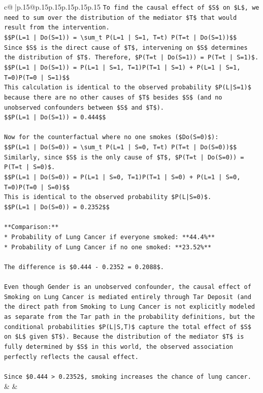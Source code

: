 \documentclass{article}
\begin{document}
{\begin{supertabular}{c@{$\;$}|p{.15\linewidth}@{}p{.15\linewidth}p{.15\linewidth}p{.15\linewidth}p{.15\linewidth}p{.15\linewidth}}
{{{\texttt{To find the causal effect of \$S\$ on \$L\$, we need to sum over the distribution of the mediator \$T\$ that would result from the intervention.} \\
\texttt{\$\$P(L=1 | Do(S=1)) = \textbackslash{}sum\_t P(L=1 | S=1, T=t) P(T=t | Do(S=1))\$\$} \\
\texttt{Since \$S\$ is the direct cause of \$T\$, intervening on \$S\$ determines the distribution of \$T\$. Therefore, \$P(T=t | Do(S=1)) = P(T=t | S=1)\$.} \\
\texttt{\$\$P(L=1 | Do(S=1)) = P(L=1 | S=1, T=1)P(T=1 | S=1) + P(L=1 | S=1, T=0)P(T=0 | S=1)\$\$} \\
\texttt{This calculation is identical to the observed probability \$P(L|S=1)\$ because there are no other causes of \$T\$ besides \$S\$ (and no unobserved confounders between \$S\$ and \$T\$).} \\
\texttt{\$\$P(L=1 | Do(S=1)) = 0.444\$\$} \\
\\ 
\texttt{Now for the counterfactual where no one smokes (\$Do(S=0)\$):} \\
\texttt{\$\$P(L=1 | Do(S=0)) = \textbackslash{}sum\_t P(L=1 | S=0, T=t) P(T=t | Do(S=0))\$\$} \\
\texttt{Similarly, since \$S\$ is the only cause of \$T\$, \$P(T=t | Do(S=0)) = P(T=t | S=0)\$.} \\
\texttt{\$\$P(L=1 | Do(S=0)) = P(L=1 | S=0, T=1)P(T=1 | S=0) + P(L=1 | S=0, T=0)P(T=0 | S=0)\$\$} \\
\texttt{This is identical to the observed probability \$P(L|S=0)\$.} \\
\texttt{\$\$P(L=1 | Do(S=0)) = 0.2352\$\$} \\
\\ 
\texttt{**Comparison:**} \\
\texttt{*   Probability of Lung Cancer if everyone smoked: **44.4\%**} \\
\texttt{*   Probability of Lung Cancer if no one smoked: **23.52\%**} \\
\\ 
\texttt{The difference is \$0.444 {-} 0.2352 = 0.2088\$.} \\
\\ 
\texttt{Even though Gender is an unobserved confounder, the causal effect of Smoking on Lung Cancer is mediated entirely through Tar Deposit (and the direct path from Smoking to Lung Cancer is not explicitly modeled as separate from the Tar path in the probability definitions, but the conditional probabilities \$P(L|S,T)\$ capture the total effect of \$S\$ on \$L\$ given \$T\$). Because the distribution of the mediator \$T\$ is fully determined by \$S\$ in this world, the observed association perfectly reflects the causal effect.} \\
\\ 
\texttt{Since \$0.444 > 0.2352\$, smoking increases the chance of lung cancer.} \\
            }
        }
    }
    & & \\ \\


\end{supertabular}}
\end{document}

